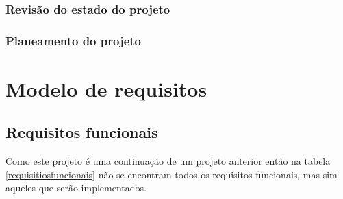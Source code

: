\documentclass[12pt, twoside]{report}
\begin{document}
	\subsection{Revisão do estado do projeto}
	\subsection{Planeamento do projeto}
	
	\chapter{Modelo de requisitos}
	\label{requisitos}
	\section{Requisitos funcionais}
	
	Como este projeto é uma continuação de um projeto anterior então na tabela \ref{requisitiosfuncionais} não se encontram todos os requisitos funcionais, mas sim aqueles que serão implementados. 
	
\end{document}
